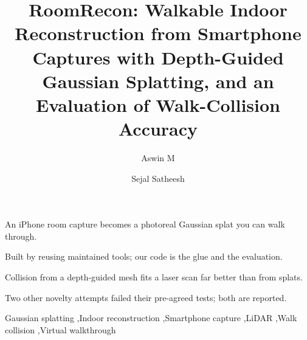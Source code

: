 \documentclass[preprint,12pt]{elsarticle}
\begin{document}
\begin{frontmatter}

\title{RoomRecon: Walkable Indoor Reconstruction from Smartphone Captures with Depth-Guided Gaussian Splatting, and an Evaluation of Walk-Collision Accuracy}

\author[1]{Aswin M}
\author[1]{Sejal Satheesh}
\address[1]{Indian Institute of Information Technology, Kottayam, India}

\begin{abstract}

\end{abstract}

\begin{highlights}
\item An iPhone room capture becomes a photoreal Gaussian splat you can walk through.
\item Built by reusing maintained tools; our code is the glue and the evaluation.
\item Collision from a depth-guided mesh fits a laser scan far better than from splats.
\item Two other novelty attempts failed their pre-agreed tests; both are reported.
\end{highlights}

\begin{keyword}
Gaussian splatting \sep Indoor reconstruction \sep Smartphone capture \sep LiDAR \sep Walk collision \sep Virtual walkthrough
\end{keyword}

\end{frontmatter}

\linenumbers








\end{document}
